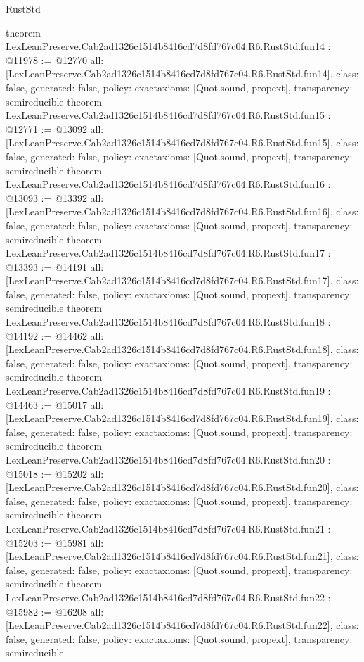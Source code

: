 \begin{lexlean}{RustStd}
\begin{coremodule}
{}
theorem LexLeanPreserve.Cab2ad1326c1514b8416cd7d8fd767c04.R6.RustStd.fun14 : @11978 := @12770 {
  all: [LexLeanPreserve.Cab2ad1326c1514b8416cd7d8fd767c04.R6.RustStd.fun14],
  class: false,
  generated: false,
  policy: exact{axioms: [Quot.sound, propext]},
  transparency: semireducible
}
theorem LexLeanPreserve.Cab2ad1326c1514b8416cd7d8fd767c04.R6.RustStd.fun15 : @12771 := @13092 {
  all: [LexLeanPreserve.Cab2ad1326c1514b8416cd7d8fd767c04.R6.RustStd.fun15],
  class: false,
  generated: false,
  policy: exact{axioms: [Quot.sound, propext]},
  transparency: semireducible
}
theorem LexLeanPreserve.Cab2ad1326c1514b8416cd7d8fd767c04.R6.RustStd.fun16 : @13093 := @13392 {
  all: [LexLeanPreserve.Cab2ad1326c1514b8416cd7d8fd767c04.R6.RustStd.fun16],
  class: false,
  generated: false,
  policy: exact{axioms: [Quot.sound, propext]},
  transparency: semireducible
}
theorem LexLeanPreserve.Cab2ad1326c1514b8416cd7d8fd767c04.R6.RustStd.fun17 : @13393 := @14191 {
  all: [LexLeanPreserve.Cab2ad1326c1514b8416cd7d8fd767c04.R6.RustStd.fun17],
  class: false,
  generated: false,
  policy: exact{axioms: [Quot.sound, propext]},
  transparency: semireducible
}
theorem LexLeanPreserve.Cab2ad1326c1514b8416cd7d8fd767c04.R6.RustStd.fun18 : @14192 := @14462 {
  all: [LexLeanPreserve.Cab2ad1326c1514b8416cd7d8fd767c04.R6.RustStd.fun18],
  class: false,
  generated: false,
  policy: exact{axioms: [Quot.sound, propext]},
  transparency: semireducible
}
theorem LexLeanPreserve.Cab2ad1326c1514b8416cd7d8fd767c04.R6.RustStd.fun19 : @14463 := @15017 {
  all: [LexLeanPreserve.Cab2ad1326c1514b8416cd7d8fd767c04.R6.RustStd.fun19],
  class: false,
  generated: false,
  policy: exact{axioms: [Quot.sound, propext]},
  transparency: semireducible
}
theorem LexLeanPreserve.Cab2ad1326c1514b8416cd7d8fd767c04.R6.RustStd.fun20 : @15018 := @15202 {
  all: [LexLeanPreserve.Cab2ad1326c1514b8416cd7d8fd767c04.R6.RustStd.fun20],
  class: false,
  generated: false,
  policy: exact{axioms: [Quot.sound, propext]},
  transparency: semireducible
}
theorem LexLeanPreserve.Cab2ad1326c1514b8416cd7d8fd767c04.R6.RustStd.fun21 : @15203 := @15981 {
  all: [LexLeanPreserve.Cab2ad1326c1514b8416cd7d8fd767c04.R6.RustStd.fun21],
  class: false,
  generated: false,
  policy: exact{axioms: [Quot.sound, propext]},
  transparency: semireducible
}
theorem LexLeanPreserve.Cab2ad1326c1514b8416cd7d8fd767c04.R6.RustStd.fun22 : @15982 := @16208 {
  all: [LexLeanPreserve.Cab2ad1326c1514b8416cd7d8fd767c04.R6.RustStd.fun22],
  class: false,
  generated: false,
  policy: exact{axioms: [Quot.sound, propext]},
  transparency: semireducible
}
\end{coremodule}
\end{lexlean}
